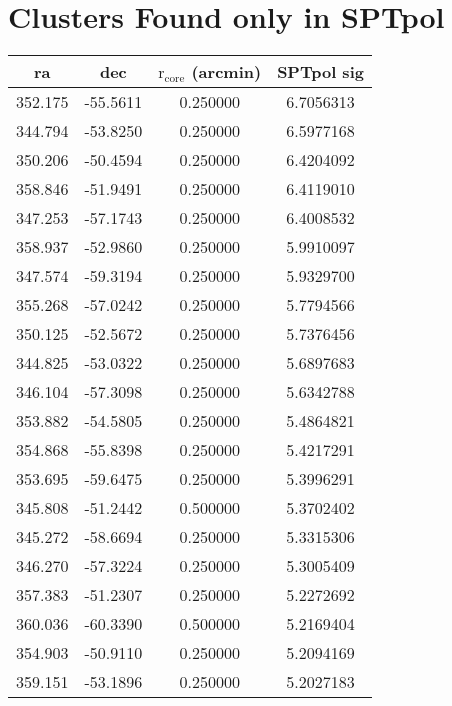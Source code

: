 \documentclass{article}
\begin{document}
\section{Clusters Found only in SPTpol}
\begin{tabular}{| c | c | c | c |}
  \hline
  ra & dec & $\mathrm{r}_\mathrm{core}$ (arcmin) & SPTpol sig\\
  \hline
      352.175 &      -55.5611 &      0.250000 &        6.7056313\\
      344.794 &      -53.8250 &      0.250000 &        6.5977168\\
      350.206 &      -50.4594 &      0.250000 &        6.4204092\\
      358.846 &      -51.9491 &      0.250000 &        6.4119010\\
      347.253 &      -57.1743 &      0.250000 &        6.4008532\\
      358.937 &      -52.9860 &      0.250000 &        5.9910097\\
      347.574 &      -59.3194 &      0.250000 &        5.9329700\\
      355.268 &      -57.0242 &      0.250000 &        5.7794566\\
      350.125 &      -52.5672 &      0.250000 &        5.7376456\\
      344.825 &      -53.0322 &      0.250000 &        5.6897683\\
      346.104 &      -57.3098 &      0.250000 &        5.6342788\\
      353.882 &      -54.5805 &      0.250000 &        5.4864821\\
      354.868 &      -55.8398 &      0.250000 &        5.4217291\\
      353.695 &      -59.6475 &      0.250000 &        5.3996291\\
      345.808 &      -51.2442 &      0.500000 &        5.3702402\\
      345.272 &      -58.6694 &      0.250000 &        5.3315306\\
      346.270 &      -57.3224 &      0.250000 &        5.3005409\\
      357.383 &      -51.2307 &      0.250000 &        5.2272692\\
      360.036 &      -60.3390 &      0.500000 &        5.2169404\\
      354.903 &      -50.9110 &      0.250000 &        5.2094169\\
      359.151 &      -53.1896 &      0.250000 &        5.2027183\\

\end{tabular}
\end{document}
